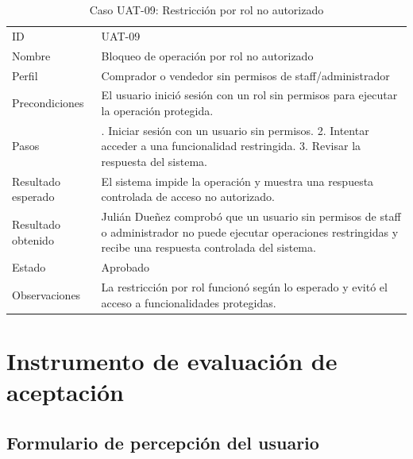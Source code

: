 \documentclass[12pt,letterpaper]{article}
\begin{document}
\begin{table}[H]
\centering
\begingroup
\footnotesize
\setlength{\tabcolsep}{3pt}
\renewcommand{\arraystretch}{1.25}

\begin{tabularx}{\textwidth}{|
>{\raggedright\arraybackslash}p{3.4cm}|
>{\raggedright\arraybackslash}X|}
\hline
\multicolumn{1}{|>{\centering\arraybackslash}m{3.4cm}|}{\textbf{Campo}} &
\multicolumn{1}{>{\centering\arraybackslash}m{10.8cm}|}{\textbf{Contenido}} \\
\hline
ID & UAT-09 \\
\hline
Nombre & Bloqueo de operación por rol no autorizado \\
\hline
Perfil & Comprador o vendedor sin permisos de staff/administrador \\
\hline
Precondiciones & El usuario inició sesión con un rol sin permisos para ejecutar la operación protegida. \\
\hline
Pasos & 1. Iniciar sesión con un usuario sin permisos. 2. Intentar acceder a una funcionalidad restringida. 3. Revisar la respuesta del sistema. \\
\hline
Resultado esperado & El sistema impide la operación y muestra una respuesta controlada de acceso no autorizado. \\
\hline
Resultado obtenido & Julián Dueñez comprobó que un usuario sin permisos de staff o administrador no puede ejecutar operaciones restringidas y recibe una respuesta controlada del sistema. \\
\hline
Estado & Aprobado \\
\hline
Observaciones & La restricción por rol funcionó según lo esperado y evitó el acceso a funcionalidades protegidas. \\
\hline
\end{tabularx}

\endgroup
\caption{Caso UAT-09: Restricción por rol no autorizado}
\label{tab:uat-09-restriccion-rol}
\end{table}

\section{Instrumento de evaluación de aceptación}

\subsection{Formulario de percepción del usuario}
\end{document}
